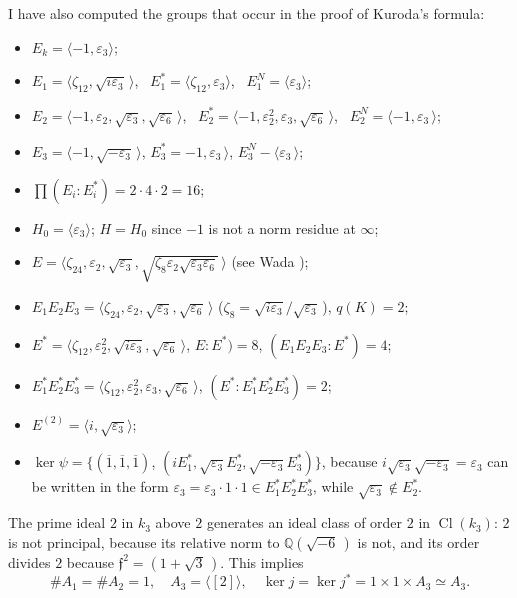 \documentclass{amsart}
\newcommand{\Q}{\mathbb Q}
\newcommand{\frf}{{\mathfrak f}}
\newcommand{\fl}{{\mathfrak 2}}
\newcommand{\eps}{\varepsilon}
\newcommand{\la}{\langle}
\newcommand{\ra}{\rangle}
\newcommand{\Cl}{\operatorname{Cl}}
\begin{document}
I have also computed the groups that occur in the proof of
Kuroda's formula:
\begin{itemize}
\item $E_k = \la -1, \eps_3 \ra$;
\item $E_1 = \la \zeta_{12}, \sqrt{i\eps_3}\,\ra$, \
      $E_1^* = \la \zeta_{12}, \eps_3\ra$, \
      $E_1^N = \la \eps_3 \ra$;
\item $E_2 = \la -1, \eps_2, \sqrt{\eps_3}, \sqrt{\eps_6} \,\ra$, \
      $E_2^* = \la -1, \eps_2^2, \eps_3, \sqrt{\eps_6}\,\ra$, \
      $E_2^N = \la -1, \eps_3 \, \ra$;
\item $E_3 = \la -1, \sqrt{-\eps_3}\,\ra$,
      $E_3^* = -1, \eps_3\, \ra$, $E_3^N - \la \eps_3 \,\ra$;
\item $\prod (E_i : E_i^*) = 2 \cdot 4 \cdot 2 = 16$;
\item $H_0 = \la \eps_3 \ra$; $H = H_0$ since $-1$ is not a norm
      residue at $\infty$;
\item $E = \la \zeta_{24}, \eps_2, \sqrt{\eps_3},
       \sqrt{\zeta_8\eps_2\sqrt{\eps_3\eps_6}}\,\ra$
      (see Wada \cite{Wad});
\item $E_1E_2E_3 = \la \zeta_{24}, \eps_2, \sqrt{\eps_3},
                        \sqrt{\eps_6}\,\ra$
      ($\zeta_8 = \sqrt{i\eps_3}/\sqrt{\eps_3}$\,), $q(K) = 2$;
\item $E^* = \la \zeta_{12}, \eps_2^2, \sqrt{i\eps_3},
        \sqrt{\eps_6}\,\ra$, $E:E^*) = 8$, $(E_1E_2E_3:E^*) = 4$;
\item $E_1^* E_2^* E_3^* = \la \zeta_{12}, \eps_2^2, \eps_3,
       \sqrt{\eps_6}\,\ra$, $(E^* : E_1^* E_2^* E_3^*) = 2$;
\item $E^{(2)} = \la i, \sqrt{\eps_3} \ra$;
\item $\ker \psi = \{(\overline{1}, \overline{1}, \overline{1})$,
      $(iE_1^*, \sqrt{\eps_3} E_2^*, \sqrt{-\eps_3} E_3^*)\}$,
      because $i \sqrt{\eps_3} \sqrt{-\eps_3} = \eps_3$ can be
      written in the form $\eps_3 = \eps_3 \cdot 1 \cdot 1 \in
      E_1^* E_2^* E_3^*$, while $\sqrt{\eps_3} \notin E_2^*$.
\end{itemize}
The prime ideal $\fl$ in $k_3$ above $2$ generates an ideal
class of order $2$ in $\Cl(k_3)$: $\fl$ is not principal,
because its relative norm to $\Q(\sqrt{-6}\,)$ is not, and
its order divides $2$ because $\frf^2 = (1+\sqrt{3}\,)$. This
implies
$$ \# A_1 = \# A_2 = 1, \quad
    A_3 = \la [\fl] \ra, \quad
   \ker j = \ker j^*  = 1 \times 1 \times A_3 \simeq A_3.$$
\end{document}

